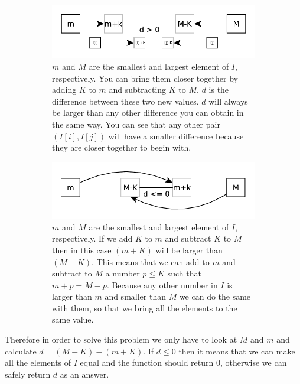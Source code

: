 \begin{figure}
	\vspace*{-0.5in}
	\centering
	\begin{subfigure}[t]{0.90\textwidth}
		\includegraphics[width=\textwidth]{sources/smallest_range/images/explanation1} 
		\caption{$m$ and $M$ are the smallest and largest element of $I$, respectively. You can
		bring them closer together by adding $K$ to $m$ and subtracting $K$ to $M$. $d$ is the
		difference between these two new values. $d$ will always be larger than any other difference
		you can obtain in the same way. You can see that any other pair $(I[i], I[j])$ will have a
		smaller difference because they are closer together to begin with.}
		\label{fig:smallest_range:explanation1} 
	 \end{subfigure}
	\medskip
	\begin{subfigure}[t]{0.90\textwidth}
		\includegraphics[width=\textwidth]{sources/smallest_range/images/explanation2} 
		\caption{$m$ and $M$ are the smallest and largest element of $I$, respectively. If we  add
		$K$ to $m$ and subtract $K$ to $M$ then in this case $(m+K)$ will be larger than $(M-K)$.
		This means that we can add to $m$ and subtract to $M$ a number $p \leq K$ such that $m+p =
		M-p$. Because any other number in $I$ is larger than $m$ and smaller than $M$ we can do the
		same with them, so that we bring all the elements to the same value.}
		\label{fig:smallest_range:explanation2} 
	 \end{subfigure}
	 \medskip
	 \label{}
	 \caption{}
\end{figure}
Therefore in order to solve this problem we only have to look at $M$ and $m$ and calculate
$d=(M-K)-(m+K)$. If $d \leq 0$ then it means that we can make all the elements of $I$ equal and the
function should return $0$, otherwise we can safely return $d$ as an answer.

